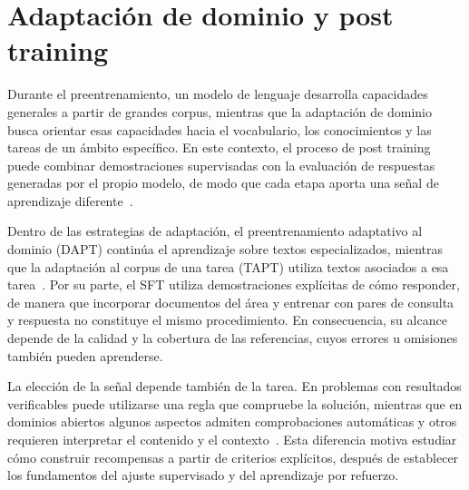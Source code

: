 \section{Adaptación de dominio y post training}
\label{sec:marco-post-training}
Durante el preentrenamiento, un modelo de lenguaje desarrolla capacidades generales a partir de grandes corpus, mientras que la adaptación de dominio busca orientar esas capacidades hacia el vocabulario, los conocimientos y las tareas de un ámbito específico. En este contexto, el proceso de post training puede combinar demostraciones supervisadas con la evaluación de respuestas generadas por el propio modelo, de modo que cada etapa aporta una señal de aprendizaje diferente~\cite{gururangan2020dontstop,ouyang2022instructgpt}.

Dentro de las estrategias de adaptación, el preentrenamiento adaptativo al dominio (DAPT) continúa el aprendizaje sobre textos especializados, mientras que la adaptación al corpus de una tarea (TAPT) utiliza textos asociados a esa tarea~\cite{gururangan2020dontstop}. Por su parte, el SFT utiliza demostraciones explícitas de cómo responder, de manera que incorporar documentos del área y entrenar con pares de consulta y respuesta no constituye el mismo procedimiento. En consecuencia, su alcance depende de la calidad y la cobertura de las referencias, cuyos errores u omisiones también pueden aprenderse.

La elección de la señal depende también de la tarea. En problemas con resultados verificables puede utilizarse una regla que compruebe la solución, mientras que en dominios abiertos algunos aspectos admiten comprobaciones automáticas y otros requieren interpretar el contenido y el contexto~\cite{deepseek2025r1,arora2025healthbench}. Esta diferencia motiva estudiar cómo construir recompensas a partir de criterios explícitos, después de establecer los fundamentos del ajuste supervisado y del aprendizaje por refuerzo.
